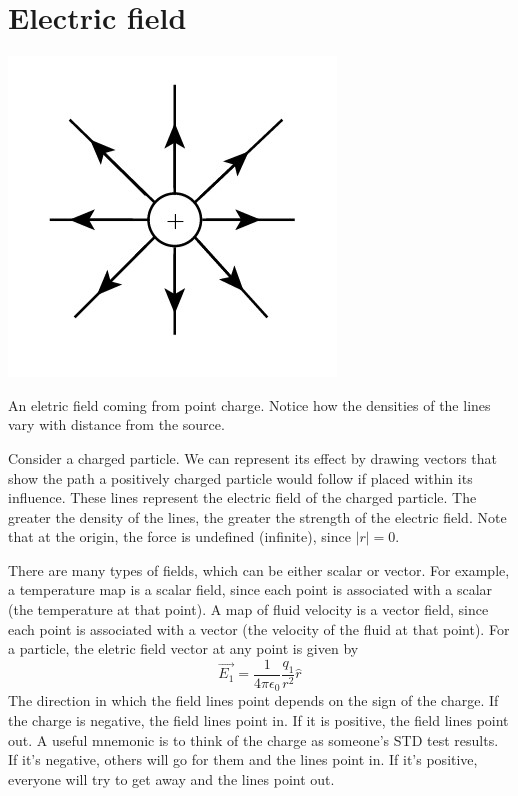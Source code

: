 \documentclass[nobib]{tufte-handout}
\begin{document}
\section{Electric field}

\begin{marginfigure}
    \includegraphics{images/electricfieldlines.jpg}
    \caption{An eletric field coming from point charge. 
    Notice how the densities of the lines vary with distance from the source.}
    \label{fig:electric-field-lines-point-charge}
\end{marginfigure}
Consider a charged particle. We can represent its effect
by drawing vectors that show the path a positively charged 
particle would follow if placed within its influence. These lines represent the 
electric field of the charged particle. The greater the density of the lines, the greater 
the strength of the electric field. Note that at the origin, the force is
undefined (infinite), since $|r| = 0$. 

There are many types of fields, which can be either scalar 
or vector. 
For example, a temperature map is a scalar field, since
each point is associated with a scalar (the temperature at that 
point). A map of fluid velocity is a vector field, since each point 
is associated with a vector (the velocity of the fluid at that point).
For a particle, the eletric field vector at any point is given by
\[\vec{E_1} = \frac{1}{4\pi \epsilon_0}\frac{q_1}{r^2}\hat{r}\]
The direction in which the field lines point depends on the 
sign of the charge. If the charge is negative, the field lines point in.
If it is positive, the field lines point out. A useful mnemonic is
to think of the charge as someone's STD test results. If it's negative,
others will go for them and the lines point in. If it's positive, everyone
will try to get away and the lines point out.
\end{document}
